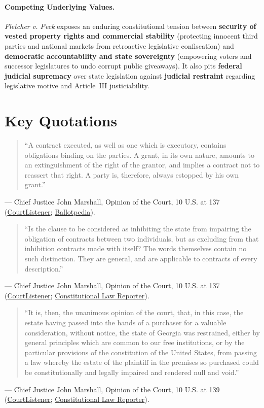 \documentclass[12pt]{article}
\begin{document}
\paragraph{Competing Underlying Values.}
\textit{Fletcher v. Peck} exposes an enduring constitutional tension between \textbf{security of vested property rights and commercial stability} (protecting innocent third parties and national markets from retroactive legislative confiscation) and \textbf{democratic accountability and state sovereignty} (empowering voters and successor legislatures to undo corrupt public giveaways). It also pits \textbf{federal judicial supremacy} over state legislation against \textbf{judicial restraint} regarding legislative motive and Article~III justiciability.

\section{Key Quotations}

\begin{quote}
``A contract executed, as well as one which is executory, contains obligations binding on the parties. A grant, in its own nature, amounts to an extinguishment of the right of the grantor, and implies a contract not to reassert that right. A party is, therefore, always estopped by his own grant.''
\end{quote}
\noindent --- Chief Justice John Marshall, Opinion of the Court, 10 U.S. at 137 (\href{https://www.courtlistener.com/opinion/84935/fletcher-v-peck/}{CourtListener}; \href{https://ballotpedia.org/Fletcher_v._Peck}{Ballotpedia}).

\begin{quote}
``Is the clause to be considered as inhibiting the state from impairing the obligation of contracts between two individuals, but as excluding from that inhibition contracts made with itself? The words themselves contain no such distinction. They are general, and are applicable to contracts of every description.''
\end{quote}
\noindent --- Chief Justice John Marshall, Opinion of the Court, 10 U.S. at 137 (\href{https://www.courtlistener.com/opinion/84935/fletcher-v-peck/}{CourtListener}; \href{https://constitutionallawreporter.com/2015/06/16/fletcher-v-peck-contract-clause/}{Constitutional Law Reporter}).

\begin{quote}
``It is, then, the unanimous opinion of the court, that, in this case, the estate having passed into the hands of a purchaser for a valuable consideration, without notice, the state of Georgia was restrained, either by general principles which are common to our free institutions, or by the particular provisions of the constitution of the United States, from passing a law whereby the estate of the plaintiff in the premises so purchased could be constitutionally and legally impaired and rendered null and void.''
\end{quote}
\noindent --- Chief Justice John Marshall, Opinion of the Court, 10 U.S. at 139 (\href{https://www.courtlistener.com/opinion/84935/fletcher-v-peck/}{CourtListener}; \href{https://constitutionallawreporter.com/2015/06/16/fletcher-v-peck-contract-clause/}{Constitutional Law Reporter}).
\end{document}
